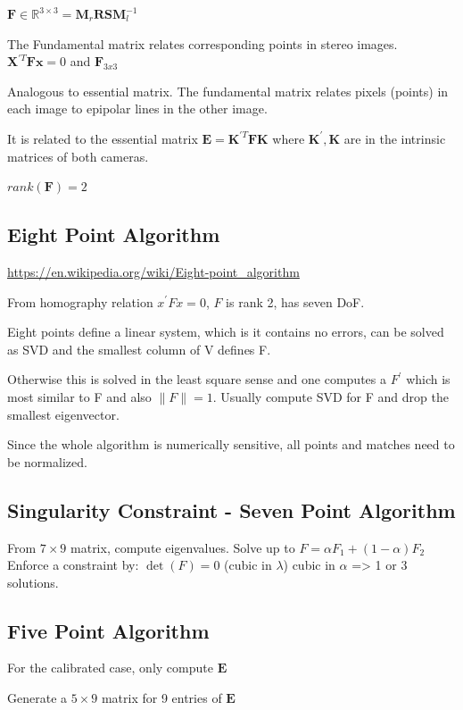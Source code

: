 $\mathbf F \in \mathbb{R}^{3\times3} = \mathbf{M}_r\mathbf{RSM}_l^{-1}$ 

The Fundamental matrix relates corresponding points in stereo images. $\mathbf{X}^{\prime T}\mathbf{Fx}=0$ and $\mathbf{F}_{3x3}$

Analogous to essential matrix. The fundamental matrix relates pixels (points) in each image to epipolar lines in the other image.

It is related to the essential matrix $\mathbf{E} = \mathbf{K}^{\prime T} \mathbf{FK}$ where $\mathbf{K}^{\prime}, \mathbf{K}$ are in the intrinsic matrices of both cameras.

$rank(\mathbf{F}) = 2$

\subsection{Eight Point Algorithm}

\url{https://en.wikipedia.org/wiki/Eight-point_algorithm}

From homography relation $x^\prime F x = 0$, $F$ is rank 2, has seven DoF. 

Eight points define a linear system, which is it contains no errors, can be solved as SVD and the smallest column of V defines F.

Otherwise this is solved in the least square sense and one computes a $F^\prime$ which is most similar to F and also $\|F\|=1$. Usually compute SVD for F and drop the smallest eigenvector. 

Since the whole algorithm is numerically sensitive, all points and matches need to be normalized. 

\subsection{Singularity Constraint - Seven Point Algorithm}
From $7\times9$ matrix, compute eigenvalues.
Solve up to $F = \alpha F_1 + (1-\alpha) F_2$
Enforce a constraint by: $\det(F) = 0$ (cubic in $\lambda$)
cubic in $\alpha$ => 1 or 3 solutions.

\subsection{Five Point Algorithm}

For the calibrated case, only compute $\mathbf{E}$

Generate a $5\times9$ matrix for 9 entries of $\mathbf{E}$

